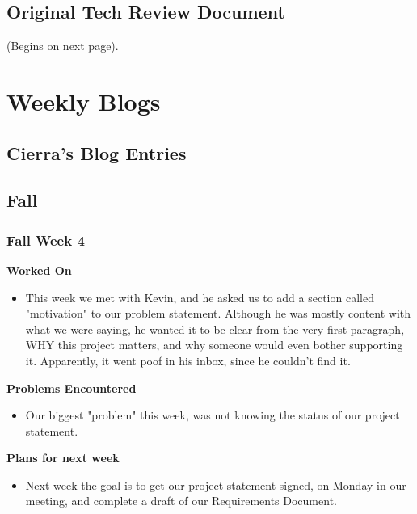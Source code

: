 \documentclass[compsoc,draftclsnofoot,onecolumn,10pt]{IEEEtran}
\begin{document}
\subsection{Original Tech Review Document}
(Begins on next page).


\clearpage
\section{Weekly Blogs}

\subsection{Cierra's Blog Entries}
    
\subsection{Fall}
\subsubsection*{Fall Week 4}
\textbf{Worked On}
\begin{itemize}
    \item This week we met with Kevin, and he asked us to add a section called "motivation" to our problem statement. Although he was mostly content with what we were saying, he wanted it to be clear from the very first paragraph, WHY this project matters, and why someone would even bother supporting it. Apparently, it went poof in his inbox, since he couldn't find it.
\end{itemize}
\textbf{Problems Encountered}
\begin{itemize}
    \item Our biggest "problem" this week, was not knowing the status of our project statement.
\end{itemize}
\textbf{Plans for next week}
\begin{itemize}
    \item Next week the goal is to get our project statement signed, on Monday in our meeting, and complete a draft of our Requirements Document.
\end{itemize}
\end{document}
